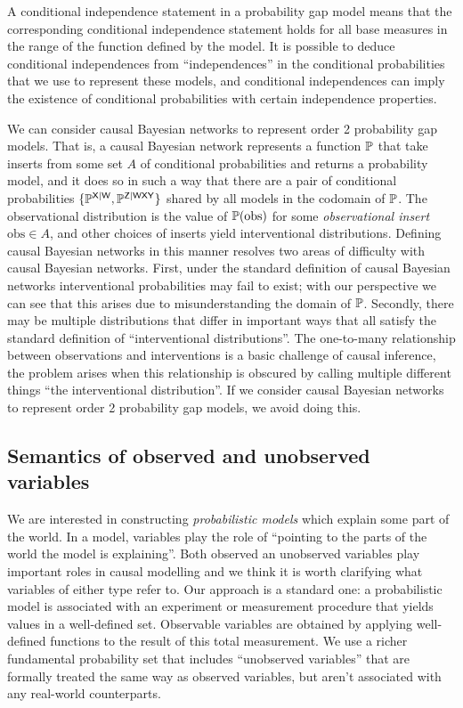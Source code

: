 A conditional independence statement in a probability gap model means that the corresponding conditional independence statement holds for all base measures in the range of the function defined by the model. It is possible to deduce conditional independences from ``independences'' in the conditional probabilities that we use to represent these models, and conditional independences can imply the existence of conditional probabilities with certain independence properties.

We can consider causal Bayesian networks to represent order 2 probability gap models. That is, a causal Bayesian network represents a function $\mathbb{P}$ that take inserts from some set $A$ of conditional probabilities and returns a probability model, and it does so in such a way that there are a pair of conditional probabilities $\{\mathbb{P}^{\mathsf{X}|\mathsf{W}},\mathbb{P}^{\mathsf{Z}|\mathsf{WXY}}\}$ shared by all models in the codomain of $\mathbb{P}$. The observational distribution is the value of $\mathbb{P}(\text{obs})$ for some \emph{observational insert} $\text{obs}\in A$, and other choices of inserts yield interventional distributions. Defining causal Bayesian networks in this manner resolves two areas of difficulty with causal Bayesian networks. First, under the standard definition of causal Bayesian networks interventional probabilities may fail to exist; with our perspective we can see that this arises due to misunderstanding the domain of $\mathbb{P}$. Secondly, there may be multiple distributions that differ in important ways that all satisfy the standard definition of ``interventional distributions''. The one-to-many relationship between observations and interventions is a basic challenge of causal inference, the problem arises when this relationship is obscured by calling multiple different things ``the interventional distribution''. If we consider causal Bayesian networks to represent order 2 probability gap models, we avoid doing this. 


\subsection{Semantics of observed and unobserved variables}\label{sec:variables}

We are interested in constructing \emph{probabilistic models} which explain some part of the world. In a model, variables play the role of ``pointing to the parts of the world the model is explaining''. Both observed an unobserved variables play important roles in causal modelling and we think it is worth clarifying what variables of either type refer to. Our approach is a standard one: a probabilistic model is associated with an experiment or measurement procedure that yields values in a well-defined set. Observable variables are obtained by applying well-defined functions to the result of this total measurement. We use a richer fundamental probability set that includes ``unobserved variables'' that are formally treated the same way as observed variables, but aren't associated with any real-world counterparts.

